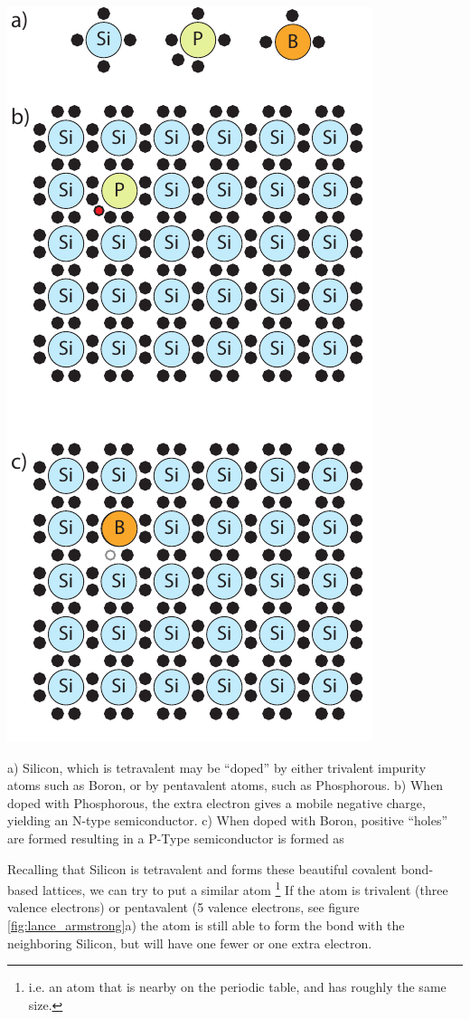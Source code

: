 \documentclass{tufte-book}
\begin{document}
\begin{marginfigure}%
  \includegraphics[]{SC_Dope}
  \caption{a) Silicon, which is tetravalent may be ``doped'' by either trivalent impurity atoms such as Boron, or by pentavalent atoms, such as Phosphorous. b) When doped with Phosphorous, the extra electron gives a mobile negative charge, yielding an N-type semiconductor. c) When doped with Boron, positive ``holes'' are formed resulting in a P-Type semiconductor is formed as }
  \label{fig:lance_armstrong}
\end{marginfigure}

Recalling that Silicon is tetravalent and forms these beautiful covalent bond-based lattices, we can try to put a similar atom \footnote{i.e. an atom that is nearby on the periodic table, and has roughly the same size.} If the atom is trivalent (three valence electrons) or pentavalent (5 valence electrons, see figure \ref{fig:lance_armstrong}a) the atom is still able to form the bond with the neighboring Silicon, but will have one fewer or one extra electron. 
\end{document}
